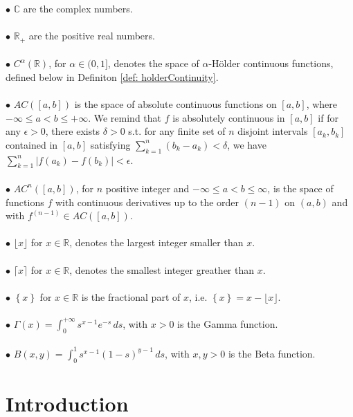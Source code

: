 \documentclass[a4paper,italian,11pt]{book}
\theoremstyle{plain}
\theoremstyle{remark}
\theoremstyle{plain}
\begin{document}
\noindent 
$\bullet$ $\mathbb{C}$ are the complex numbers.
\\
\\
\noindent
$\bullet$ $\mathbb{R}_+$ are the positive real numbers.
\\
\\
\noindent
$\bullet$ $C^\alpha (\mathbb{R})$, for $\alpha \in (0,1]$, denotes the space of $\alpha$-Hölder continuous functions, defined below in Definiton \ref{def: holderContinuity}.
\\
\\
\noindent
$\bullet$ $AC([a,b])$ is the space of absolute continuous functions on $[a,b]$, where $-\infty \le a < b \le +\infty$. We remind that $f$ is absolutely continuous in $[a,b]$ if for any $\epsilon >0$, there exists $\delta >0$ s.t. for any finite set of $n$ disjoint intervals $[a_k,b_k]$ contained in $[a,b]$ satisfying $\sum_{k=1}^n (b_k-a_k) <\delta$, we have $\sum_{k=1}^n |f(a_k)-f(b_k)|<\epsilon$.
\\
\\
\noindent
$\bullet$ $AC^n([a,b])$, for $n$ positive integer and $-\infty \le a < b \le \infty$, is the space of functions $f$ with continuous derivatives up to the order $(n-1)$ on $(a,b)$ and with $f^{(n-1)}\in AC([a,b]).$
\\
\\
\noindent
$\bullet$ $\lfloor x \rfloor $ for $x \in \mathbb{R}$, denotes the largest integer smaller than $x$.
\\
\\
\noindent
$\bullet$ $\lceil x \rceil$ for $x \in \mathbb{R}$, denotes the smallest integer greather than $x$.
\\
\\
\noindent
$\bullet$ $\left\{x \right\}$ for $x \in \mathbb{R}$ is the fractional part of $x$, i.e. $\left\{ x \right\} = x-\lfloor x \rfloor$.
\\
\\
\noindent
$\bullet$ $\Gamma(x) = \int_0^{+\infty}s^{x-1}e^{-s}\, ds$, with $x>0$ is the Gamma function.
\\
\\
\noindent
$\bullet$ $B(x,y) = \int_0^1 s^{x-1}(1-s)^{y-1} \, ds$, with $x,y>0$ is the Beta function.

\chapter*{Introduction}
\end{document}
